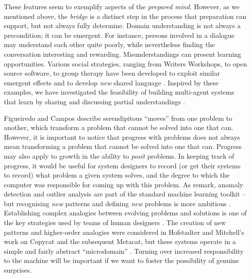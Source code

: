 These features seem to exemplify aspects of the \emph{prepared mind}.
However, as we mentioned above, the \emph{bridge} is a distinct step
in the process that preparation can support, but not always fully
determine.  Domain understanding is not always a precondition; it can
be emergent.  For instance, persons involved in a dialogue may
understand each other quite poorly, while nevertheless finding the
conversation interesting and rewarding.  Misunderstandings can present
learning opportunities.  Various social strategies, ranging from
Writers Workshops, to open source software, to group therapy have been
developed to exploit similar emergent effects and to develop
\emph{new} shared language \cite{gabriel2002writer,seikkula2014open}.
Inspired by these examples, we have investigated the feasibility of
building multi-agent systems that learn by sharing and discussing
partial understandings
\cite{corneli2015computational,corneli2015feedback}.

Figueiredo and Campos \citeyear{Figueiredo2001} describe serendipitous ``moves'' from one
problem to another, which transform a problem that cannot be solved
into one that can.  
However, it is important to notice that progress with problems does not always mean transforming a
problem that cannot be solved into one that can.  Progress may also
apply to growth in the ability to \emph{posit} problems.  In keeping
track of progress, it would be useful for system designers to record
(or get their systems to record) what problem a given system solves,
and the degree to which the computer was responsible for coming up
with this problem.
%
As  remark, anomaly detection and
outlier analysis are part of the standard machine learning toolkit --
but recognising \emph{new} patterns and defining \emph{new} problems
is more ambitious \cite{von2003cybernetics}.  Establishing complex
analogies between evolving problems and solutions is one of the key
strategies used by teams of human designers
\cite{Analogical-problem-evolution-DCC}.  The creation of new patterns
and higher-order analogies were considered in Hofstadter and
Mitchell's work on {\sf Copycat} and the subsequent {\sf Metacat}, but
these systems operate in a simple and fairly abstract ``microdomain''
\cite{hofstadter1994copycat,DBLP:journals/jetai/Marshall06}.
%
Turning over increased responsibility to the machine will be important
if we want to foster the possibility of genuine surprises.

